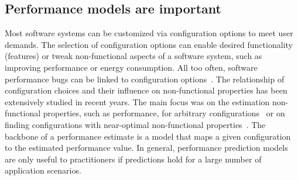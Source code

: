 \subsection*{Performance models are important}
Most software systems can be customized via configuration options to meet user demands. The selection of configuration options can enable desired functionality (features) or tweak non-functional aspects of a software system, such as improving performance or energy consumption. 
All too often, software performance bugs can be linked to configuration options~\cite{han_empirical_2016}. 
The relationship of configuration choices and their influence on non-functional properties has been extensively studied in recent years. The main focus was on the estimation non-functional properties, such as performance, for arbitrary configurations~\cite{dorn2020,siegmundPerformanceinfluenceModelsHighly2015,haDeepPerf2019,perfAL,guoVariabilityawarePerformancePrediction2013,sarkarCostEfficientSamplingPerformance,guo_2018_data,fourier_learning_2015,perLasso} or on finding configurations with near-optimal non-functional properties~\cite{nairUsingBadLearners2017,nairFlash18,ohFindingNearoptimalConfigurations2017}. 
The backbone of a performance estimate is a model that maps a given configuration to the estimated performance value. 
In general, performance prediction models are only useful to practitioners if predictions hold for a large number of application scenarios.

